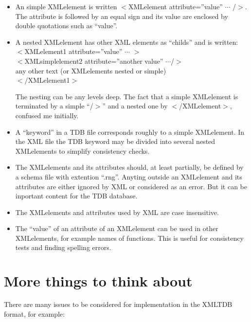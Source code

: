 \documentclass[12pt]{article}
\begin{document}
\begin{itemize}
\item An simple XMLelement is written $<$XMLelement
  attribute=''value'' $\cdots$ /$>$.  The attribute is followed by an
  equal sign and its value are enclosed by double quotations such as
  ``value''.

\item A nested XMLelement has other XML elements as ``childs'' and is
  written:\\
  $<$XMLelement1 attribute=''value'' $\cdots$ $>$\\
  $<$XMLsimplelement2 attribute=''another value'' $\cdots$/$>$\\
  any other text (or XMLelements nested or simple)\\
  $<$/XMLelement1$>$

  The nesting can be any levels deep.  The fact that a simple
  XMLelement is terminated by a simple ``/$>$'' and a nested one by
  $<$/XMLelement$>$, confused me initially.

\item A ``keyword'' in a TDB file corresponds roughly to a simple
  XMLelement.  In the XML file the TDB keyword may be divided into
  several nested XMLelements to simplify consistency checks.
  
\item The XMLelements and its attributes should, at least partially,
  be defined by a schema file with extention ``.rng''.  Anyting
  outside an XMLelement and its attributes are either ignored by XML
  or considered as an error.  But it can be inportant content for the
  TDB database.

\item The XMLelements and attributes used by XML are case insensitive.

\item The ``value'' of an attribute of an XMLelement can be used in
  other XMLelements, for example names of functions.  This is useful
  for consistency tests and finding spelling errors.
\end{itemize}

\section{More things to think about}

There are many issues to be considered for implementation in the
XMLTDB format, for example:
\end{document}
